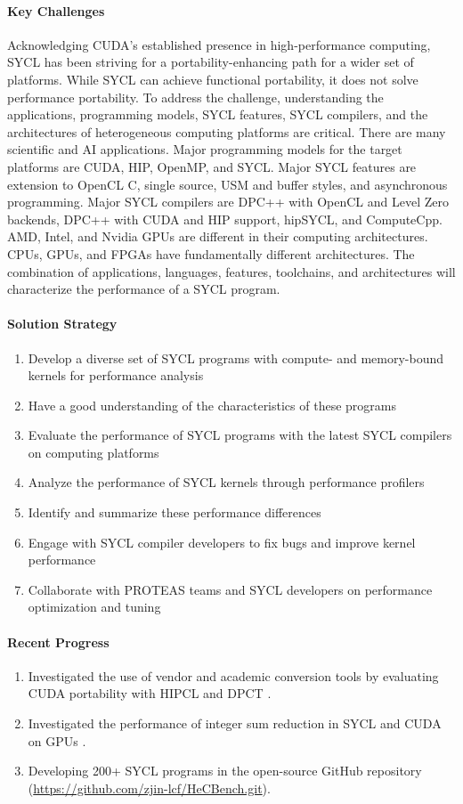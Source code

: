 \paragraph{Key Challenges}
Acknowledging CUDA's established presence in high-performance computing, SYCL has been striving for a portability-enhancing path for a wider set of platforms. While SYCL can achieve functional portability, it does not solve performance portability. To address the challenge, understanding the applications, programming models, SYCL features, SYCL compilers, and the architectures of heterogeneous computing platforms are critical. There are many scientific and AI applications. Major programming models for the target platforms are CUDA, HIP, OpenMP, and SYCL. Major SYCL features are extension to OpenCL C, single source, USM and buffer styles, and asynchronous programming. Major SYCL compilers are DPC++ with OpenCL and Level Zero backends, DPC++ with CUDA and HIP support, hipSYCL, and ComputeCpp. AMD, Intel, and Nvidia GPUs are different in their computing architectures. CPUs, GPUs, and FPGAs have fundamentally different architectures. The combination of applications, languages, features, toolchains, and architectures will characterize the performance of a SYCL program.


\paragraph{Solution Strategy}
\begin{enumerate}
\item Develop a diverse set of SYCL programs with compute- and memory-bound kernels for performance analysis  
\item Have a good understanding of the characteristics of these programs 
\item Evaluate the performance of SYCL programs with the latest SYCL compilers on computing platforms
\item Analyze the performance of SYCL kernels through performance profilers
\item Identify and summarize these performance differences
\item Engage with SYCL compiler developers to fix bugs and improve kernel performance
\item Collaborate with PROTEAS teams and SYCL developers on performance optimization and tuning
\end{enumerate}


\paragraph{Recent Progress}
\begin{enumerate}
\item Investigated the use of vendor and academic conversion tools by evaluating CUDA portability with HIPCL and DPCT \cite{dpct}.
\item Investigated the performance of integer sum reduction in SYCL and CUDA on GPUs \cite{reduction}.
\item Developing 200+ SYCL programs in the open-source GitHub repository (\url{https://github.com/zjin-lcf/HeCBench.git}).
\end{enumerate}


